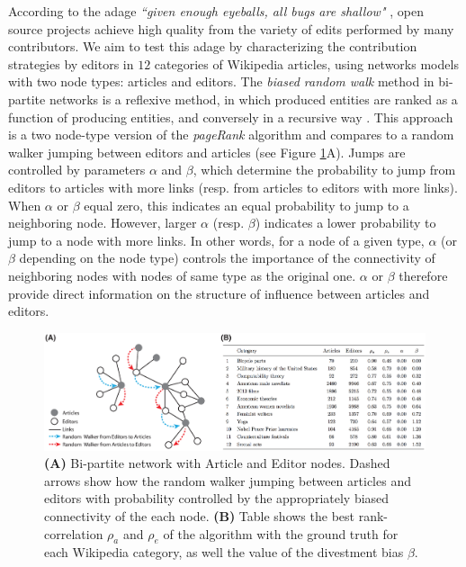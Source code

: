 \documentclass[letterpaper,9pt,a4paper]{article}
\begin{document}
\vspace{0.05cm}
According to the adage {\it ``given enough eyeballs, all bugs are shallow"} \cite{raymond1999}, open source projects achieve high quality from the variety of edits performed by many contributors. We aim to test this adage by characterizing the contribution strategies by editors in $12$ categories of Wikipedia articles, using networks models with two node types: articles and editors. The {\it biased random walk} method in bi-partite networks \cite{caldarelli2012network} is a reflexive method, in which produced entities are ranked as a function of producing entities, and conversely in a recursive way \cite{hidalgo2009}. This approach is a two node-type version of the {\it pageRank} algorithm \cite{page1999pagerank} and compares to a random walker jumping between editors and articles (see Figure \ref{fig1}A). Jumps are controlled by parameters $\alpha$ and $\beta$, which determine the probability to jump from editors to articles with more links (resp. from articles to editors with more links). When $\alpha$ or $\beta$ equal zero, this indicates an equal probability to jump to a neighboring node. However, larger $\alpha$ (resp. $\beta$) indicates a lower probability to jump to a node with more links. In other words, for a node of a given type, $\alpha$ (or $\beta$ depending on the node type) controls the importance of the connectivity of neighboring nodes with nodes of same type as the original one. $\alpha$ or $\beta$ therefore provide direct information on the structure of influence between articles and editors.

\begin{figure}[h]
\centering
\includegraphics[width=1.\columnwidth]{Figures/figure_abstract.eps}
\caption{\footnotesize {\bf (A)} Bi-partite network with Article and Editor nodes. Dashed arrows show how the random walker jumping between articles and editors with  probability controlled by the appropriately biased connectivity of the each node. {\bf (B)} Table shows the best rank-correlation $\rho_a$ and $\rho_e$ of the algorithm with the ground truth for each Wikipedia category, as well the value of the divestment bias $\beta$.}
\label{fig1}
\end{figure}
\end{document}
